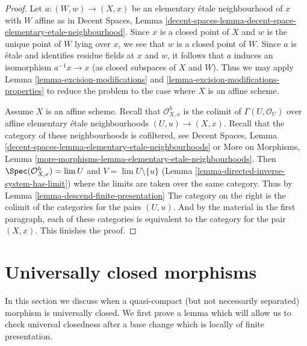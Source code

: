 \begin{proof}
Let $a : (W, w) \to (X, x)$ be an elementary \'etale neighbourhood of $x$
with $W$ affine as in
Decent Spaces, Lemma
\ref{decent-spaces-lemma-decent-space-elementary-etale-neighbourhood}.
Since $x$ is a closed point of $X$ and $w$ is the unique point of $W$
lying over $x$, we see that $w$ is a closed point of $W$. Since $a$
is \'etale and identifies residue fields at $x$ and $w$, it
follows that $a$ induces an isomorphism $a^{-1}x \to x$ (as closed
subspaces of $X$ and $W$). Thus we may apply
Lemma \ref{lemma-excision-modifications} and
\ref{lemma-excision-modifications-properties}
to reduce the problem to the case where $X$ is an affine scheme.

\medskip\noindent
Assume $X$ is an affine scheme. Recall that $\mathcal{O}_{X, x}^h$
is the colimit of $\Gamma(U, \mathcal{O}_U)$ over affine
elementary \'etale neighbourhoods $(U, u) \to (X, x)$.
Recall that the category of these neighbourhoods is
cofiltered, see Decent Spaces, Lemma
\ref{decent-spaces-lemma-elementary-etale-neighbourhoods} or
More on Morphisms, Lemma
\ref{more-morphisms-lemma-elementary-etale-neighbourhoods}.
Then $\Spec(\mathcal{O}_{X, x}^h) = \lim U$ and
$V = \lim U \setminus \{u\}$
(Lemma \ref{lemma-directed-inverse-system-has-limit})
where the limits are taken over the same category. Thus by
Lemma \ref{lemma-descend-finite-presentation}
The category on the right is the colimit of the categories
for the pairs $(U, u)$. And by the material in the first
paragraph, each of these categories is equivalent to the
category for the pair $(X, x)$. This finishes the proof.
\end{proof}






\section{Universally closed morphisms}
\label{section-universally-closed}

\noindent
In this section we discuss when a quasi-compact (but not necessarily
separated) morphism is universally closed. We first prove a lemma which
will allow us to check universal closedness after a base change
which is locally of finite presentation.

